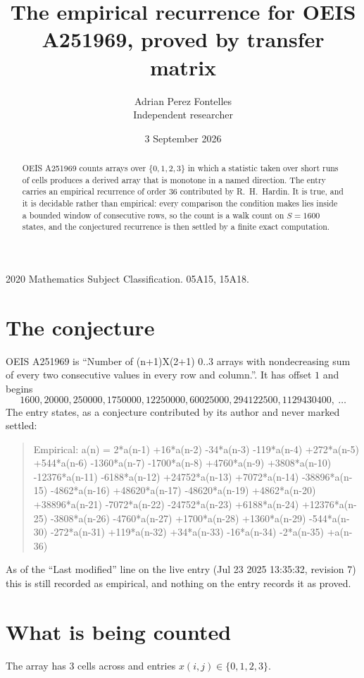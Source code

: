 \documentclass[11pt,a4paper]{article}
\title{The empirical recurrence for OEIS A251969, proved by transfer matrix}
\author{Adrian Perez Fontelles\\ \small Independent researcher}
\date{3 September 2026}
\theoremstyle{plain}
\theoremstyle{definition}
\begin{document}
\maketitle

\begin{abstract}
OEIS A251969 counts arrays over $\{0,1,2,3\}$ in which a statistic taken over short runs
of cells produces a derived array that is monotone in a named direction. The entry carries an
empirical recurrence of order $36$ contributed by R.~H.~Hardin. It is true, and it is
decidable rather than empirical: every comparison the condition makes lies inside a bounded
window of consecutive rows, so the count is a walk count on $S=1600$ states, and the
conjectured recurrence is then settled by a finite exact computation.
\end{abstract}

\noindent\small 2020 Mathematics Subject Classification. 05A15, 15A18.\normalsize

\section{The conjecture}

OEIS A251969 is ``Number of (n+1)X(2+1) 0..3 arrays with nondecreasing sum of every two consecutive values in every row and column.''. It has offset $1$ and begins
\[
1600, 20000, 250000, 1750000, 12250000, 60025000, 294122500, 1129430400,\ \dots
\]
The entry states, as a conjecture contributed by its author and never marked settled:
\begin{quote}
Empirical: a(n) = 2*a(n-1) +16*a(n-2) -34*a(n-3) -119*a(n-4) +272*a(n-5) +544*a(n-6) -1360*a(n-7) -1700*a(n-8) +4760*a(n-9) +3808*a(n-10) -12376*a(n-11) -6188*a(n-12) +24752*a(n-13) +7072*a(n-14) -38896*a(n-15) -4862*a(n-16) +48620*a(n-17) -48620*a(n-19) +4862*a(n-20) +38896*a(n-21) -7072*a(n-22) -24752*a(n-23) +6188*a(n-24) +12376*a(n-25) -3808*a(n-26) -4760*a(n-27) +1700*a(n-28) +1360*a(n-29) -544*a(n-30) -272*a(n-31) +119*a(n-32) +34*a(n-33) -16*a(n-34) -2*a(n-35) +a(n-36)
\end{quote}
As of the ``Last modified'' line on the live entry (Jul 23 2025 13:35:32, revision 7) this is still
recorded as empirical, and nothing on the entry records it as proved.

\section{What is being counted}

The array has $3$ cells across and entries $x(i,j)\in\{0,1,2,3\}$.
\end{document}
